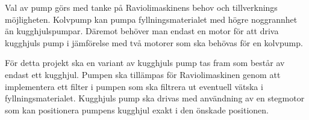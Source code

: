 Val av pump görs med tanke på Raviolimaskinens behov och tillverknings möjligheten. Kolvpump kan pumpa fyllningsmaterialet med högre noggrannhet än kugghjulspumpar. Däremot behöver man endast en motor för att driva kugghjuls pump i jämförelse med två motorer som ska behövas för en kolvpump.

För detta projekt ska en variant av kugghjuls pump tas fram som består av endast ett kugghjul. Pumpen ska tillämpas för Raviolimaskinen genom att implementera ett filter i pumpen som ska filtrera ut eventuell vätska i fyllningsmaterialet. Kugghjuls pump ska drivas med användning av en stegmotor som kan positionera pumpens kugghjul exakt i den önskade positionen.
